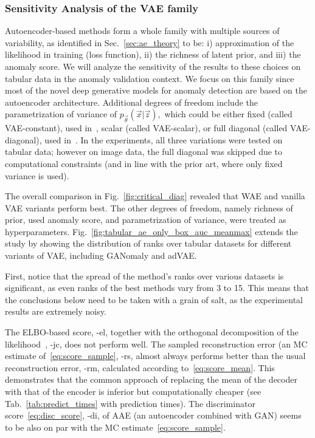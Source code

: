 \subsubsection{Sensitivity Analysis of the VAE family}
\label{sec:vae_results}
Autoencoder-based methods form a whole family with multiple sources of variability, as identified in Sec.~\ref{sec:ae_theory} to be: i) approximation of the likelihood in training (loss function), ii) the richness of latent prior, and iii) the anomaly score. We will analyze the sensitivity of the results to these choices on tabular data in the anomaly validation context. We focus on this family since most of the novel deep generative models for anomaly detection are based on the autoencoder architecture. Additional degrees of freedom include the parametrization of variance of $p_{\vec{\theta}}(\vec{x}|\vec{z}),$ which could be either fixed (called VAE-constant), used in~\cite{yaoUnsupervisedAnomalyDetection2019, wang2020advae, ahnDeepGenerativeModelsBased2020}, scalar (called VAE-scalar), or full diagonal (called VAE-diagonal), used in~\cite{an2015variational,xu2018unsupervised, zenatiEfficientGANBasedAnomaly2018}. In the experiments, all three variations were tested on tabular data; however on image data, the full diagonal was skipped due to computational constraints (and in line with the prior art, where only fixed variance is used).

The overall comparison in Fig.~\ref{fig:critical_diag} revealed that WAE and vanilla VAE variants perform best. The other degrees of freedom, namely richness of prior, used anomaly score, and parametrization of variance, were treated as hyperparameters. Fig.~\ref{fig:tabular_ae_only_box_auc_meanmax} extends the study by showing the distribution of ranks over tabular datasets for different variants of VAE, including GANomaly and adVAE.

First, notice that the spread of the method's ranks over various datasets is significant, as even ranks of the best methods vary from 3 to 15. This means that the conclusions below need to be taken with a grain of salt, as the experimental results are extremely noisy.

The ELBO-based score,  -el, together with the orthogonal decomposition of the likelihood~\cite{pidhorskyi2018generative}, -jc, does not perform well. The sampled reconstruction error (an MC estimate of~\eqref{eq:score_sample}, \mbox{-rs}, almost always performs better than the usual reconstruction error, -rm, calculated according to~\eqref{eq:score_mean}. This demonstrates that the common approach of replacing the mean of the decoder with that of the encoder is inferior but computationally cheaper (see Tab.~\ref{tab:predict_times} with prediction times). The discriminator score~\eqref{eq:disc_score}, -di, of AAE (an autoencoder combined with GAN) seems to be also on par with the MC estimate~\eqref{eq:score_sample}. 


